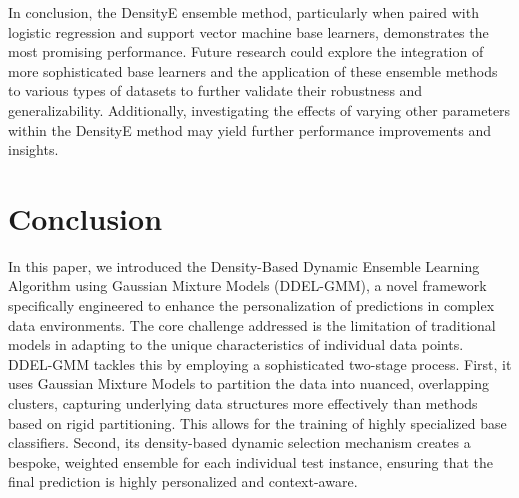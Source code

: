 \documentclass[lettersize,journal]{IEEEtran}
\newcommand{\tfourhighlight}[1]{{\color{tier4blue}#1}}
\begin{document}
	\tfourhighlight{In conclusion, the DensityE ensemble method, particularly when paired
	with logistic regression and support vector machine base learners, demonstrates the most promising performance. Future research could explore the
	integration of more sophisticated base learners and the application of these
	ensemble methods to various types of datasets to further validate their robustness and generalizability. Additionally, investigating the effects of varying other parameters within the DensityE method may yield further performance improvements and insights.}
	
	
	\section{Conclusion}
	\noindent
	
	\tfourhighlight{In this paper, we introduced the Density-Based Dynamic Ensemble Learning Algorithm using Gaussian Mixture Models (DDEL-GMM), a novel framework specifically engineered to enhance the personalization of predictions in complex data environments. The core challenge addressed is the limitation of traditional models in adapting to the unique characteristics of individual data points. DDEL-GMM tackles this by employing a sophisticated two-stage process. First, it uses Gaussian Mixture Models to partition the data into nuanced, overlapping clusters, capturing underlying data structures more effectively than methods based on rigid partitioning. This allows for the training of highly specialized base classifiers. Second, its density-based dynamic selection mechanism creates a bespoke, weighted ensemble for each individual test instance, ensuring that the final prediction is highly personalized and context-aware.}
	
\end{document}
